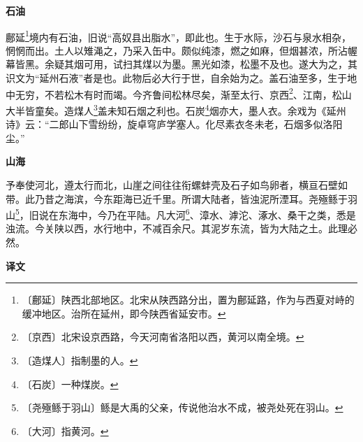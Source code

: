 \documentclass[12pt,UTF-8,openany,a4]{ctexbook}
\begin{document}
\begin{large}
    \begin{center}{\Large\textbf{石油}}\end{center}
    
    鄜延\footnote{〔鄜延〕\yiwen 陕西北部地区。北宋从陕西路分出，置为鄜延路，作为与西夏对峙的缓冲地区。治所在延州，即今陕西省延安市。}境内有石油，旧说“高奴县出脂水”，即此也。生于水际，沙石与泉水相杂，惘惘而出。土人以雉渑之，乃采入缶中。颇似纯漆，燃之如麻，但烟甚浓，所沾幄幕皆黑。余疑其烟可用，试扫其煤以为墨。黑光如漆，松墨不及也。遂大为之，其识文为“延州石液”者是也。此物后必大行于世，自余始为之。盖石油至多，生于地中无穷，不若松木有时而竭。今齐鲁间松林尽矣，渐至太行、京西\footnote{〔京西〕\yiwen 北宋设京西路，今天河南省洛阳以西，黄河以南全境。}、江南，松山大半皆童矣。造煤人\footnote{〔造煤人〕\yiwen 指制墨的人。}盖未知石烟之利也。石炭\footnote{〔石炭〕\yiwen 一种煤炭。}烟亦大，墨人衣。余戏为《延州诗》云：“二郎山下雪纷纷，旋卓穹庐学塞人。化尽素衣冬未老，石烟多似洛阳尘。”
    
    \begin{center}{\Large\textbf{山海}}\end{center}
    
    予奉使河北，遵太行而北，山崖之间往往衔螺蚌壳及石子如鸟卵者，横亘石壁如带。此乃昔之海滨，今东距海已近千里。所谓大陆者，皆浊泥所湮耳。尧殛鲧于羽山\footnote{〔尧殛鲧于羽山〕\yiwen 鲧是大禹的父亲，传说他治水不成，被尧处死在羽山。}，旧说在东海中，今乃在平陆。凡大河\footnote{〔大河〕\yiwen 指黄河。}、漳水、滹沱、涿水、桑干之类，悉是浊流。今关陕以西，水行地中，不减百余尺。其泥岁东流，皆为大陆之土。此理必然。
\end{large}


\newpage

\begin{Large}
    \noindent\textbf{译文}
\end{Large}


\vspace{1em}
\end{document}
